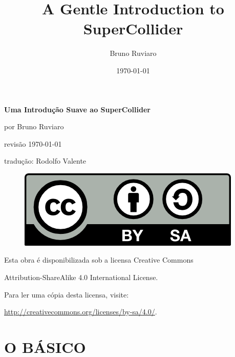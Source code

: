 \documentclass[11pt]{article}
\title{\textbf{A Gentle Introduction to SuperCollider}}
\author{Bruno Ruviaro}
\date{\today}
\begin{document}
\vspace*{\fill}
\begin{center}
{\LARGE \textbf{Uma Introdução Suave ao SuperCollider}}

\bigskip
por Bruno Ruviaro

\medskip
revisão \today

tradução: Rodolfo Valente


\bigskip
\bigskip

\begin{figure}[h]
\begin{center}
\includegraphics[scale=1]{fig-by-sa.png}
\end{center}
\end{figure}

\bigskip
Esta obra é disponibilizada sob a licensa Creative Commons

Attribution-ShareAlike 4.0 International License.

Para ler uma cópia desta licensa, visite:

\url{http://creativecommons.org/licenses/by-sa/4.0/}.



\end{center}
\vspace*{\fill}
\thispagestyle{empty}
\clearpage

\tableofcontents
\maketitle
{}


\part{O BÁSICO}












\newpage
\end{document}
